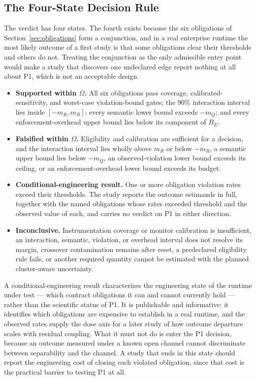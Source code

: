 \documentclass[11pt]{article}
\begin{document}
\subsection{The Four-State Decision Rule}
\label{sec:decision-rule}

The verdict has four states. The fourth exists because the six obligations of Section~\ref{sec:obligations} form a conjunction, and in a real enterprise runtime the most likely outcome of a first study is that some obligations clear their thresholds and others do not. Treating the conjunction as the only admissible entry point would make a study that discovers one undeclared edge report nothing at all about P1, which is not an acceptable design.

\begin{itemize}
\item \textbf{Supported within $\Omega$.} All six obligations pass coverage, calibrated-sensitivity, and worst-case violation-bound gates; the 90\% interaction interval lies inside $[-m_R,m_R]$; every semantic lower bound exceeds $-m_Q$; and every enforcement-overhead upper bound lies below its component of $B_E$.
\item \textbf{Falsified within $\Omega$.} Eligibility and calibration are sufficient for a decision, and the interaction interval lies wholly above $m_R$ or below $-m_R$, a semantic upper bound lies below $-m_Q$, an observed-violation lower bound exceeds its ceiling, or an enforcement-overhead lower bound exceeds its budget.
\item \textbf{Conditional-engineering result.} One or more obligation violation rates exceed their thresholds. The study reports the outcome estimands in full, together with the named obligations whose rates exceeded threshold and the observed value of each, and carries no verdict on P1 in either direction.
\item \textbf{Inconclusive.} Instrumentation coverage or monitor calibration is insufficient, an interaction, semantic, violation, or overhead interval does not resolve its margin, crossover contamination remains after reset, a predeclared eligibility rule fails, or another required quantity cannot be estimated with the planned cluster-aware uncertainty.
\end{itemize}

A conditional-engineering result characterizes the engineering state of the runtime under test --- which contract obligations it can and cannot currently hold --- rather than the scientific status of P1. It is publishable and informative: it identifies which obligations are expensive to establish in a real runtime, and the observed rates supply the dose axis for a later study of how outcome departure scales with residual coupling. What it must not do is enter the P1 decision, because an outcome measured under a known open channel cannot discriminate between separability and the channel. A study that ends in this state should report the engineering cost of closing each violated obligation, since that cost is the practical barrier to testing P1 at all.
\end{document}
